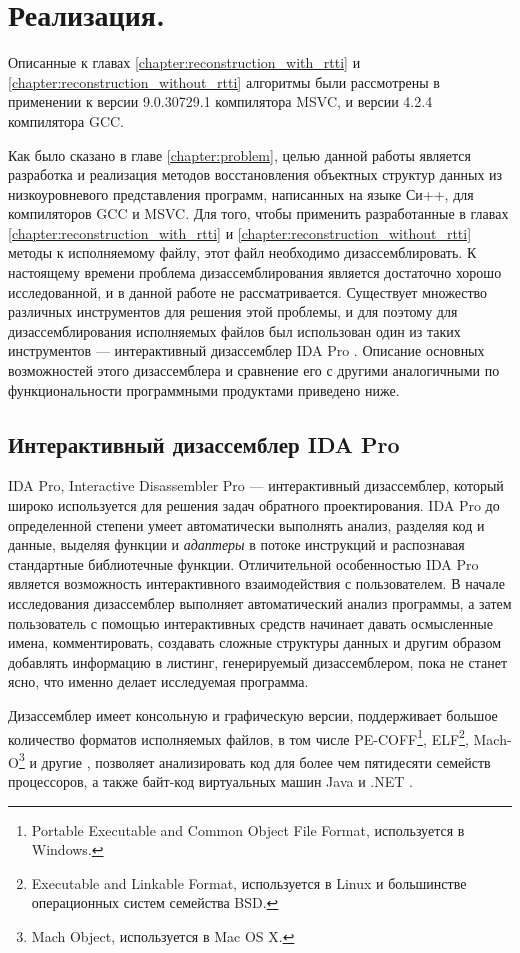\newpage
\section{Реализация.}
Описанные к главах \ref{chapter:reconstruction_with_rtti} и \ref{chapter:reconstruction_without_rtti} алгоритмы были рассмотрены в применении к версии 9.0.30729.1 компилятора MSVC, и версии 4.2.4 компилятора GCC.

Как было сказано в главе \ref{chapter:problem}, целью данной работы является разработка и реализация методов восстановления объектных структур данных из низкоуровневого представления программ, написанных на языке Си++, для компиляторов GCC и MSVC. Для того, чтобы применить разработанные в главах \ref{chapter:reconstruction_with_rtti} и \ref{chapter:reconstruction_without_rtti} методы к исполняемому файлу, этот файл необходимо дизассемблировать. К настоящему времени проблема дизассемблирования является достаточно хорошо исследованной, и в данной работе не рассматривается. Существует множество различных инструментов для решения этой проблемы, и для поэтому для дизассемблирования исполняемых файлов был использован один из таких инструментов --- интерактивный дизассемблер IDA Pro \cite{idapro}. Описание основных возможностей этого дизассемблера и сравнение его с другими аналогичными по функциональности программными продуктами приведено ниже.


\subsection{Интерактивный дизассемблер IDA Pro}\label{chapter:idapro}
IDA Pro, Interactive Disassembler Pro --- интерактивный дизассемблер, который широко используется для решения задач обратного проектирования. IDA Pro до определенной степени умеет автоматически выполнять анализ, разделяя код и данные, выделяя функции и {\it адаптеры} в потоке инструкций и распознавая стандартные библиотечные функции. Отличительной особенностью IDA Pro является возможность интерактивного взаимодействия с пользователем. В начале исследования дизассемблер выполняет автоматический анализ программы, а затем пользователь с помощью интерактивных средств начинает давать осмысленные имена, комментировать, создавать сложные структуры данных и другим образом добавлять информацию в листинг, генерируемый дизассемблером, пока не станет ясно, что именно делает исследуемая программа.

Дизассемблер имеет консольную и графическую версии, поддерживает большое количество форматов исполняемых файлов, в том числе PE-COFF\footnote{Portable Executable and Common Object File Format, используется в Windows.}, ELF\footnote{Executable and Linkable Format, используется в Linux и большинстве операционных систем семейства BSD.}, Mach-O\footnote{Mach Object, используется в Mac OS X.} и другие \cite{idaproformats}, позволяет анализировать код для более чем пятидесяти семейств процессоров, а также байт-код виртуальных машин Java и .NET \cite{idaproproc}.

